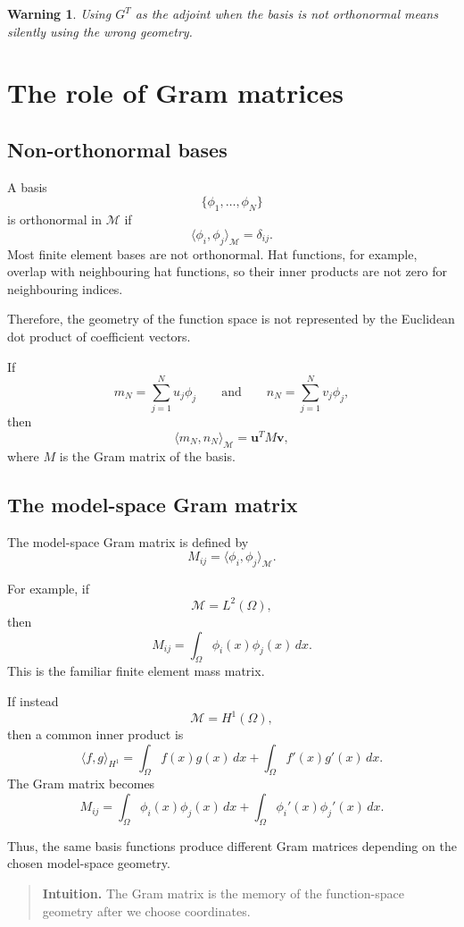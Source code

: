 \documentclass[11pt,a4paper]{book}
\newtheorem{warning}[definition]{Warning}
\newenvironment{intuition}
  {\begin{quote}\textbf{Intuition.}}
  {\end{quote}}
\newcommand{\M}{\mathcal{M}}      %
\begin{document}
\begin{warning}
Using $G^T$ as the adjoint when the basis is not orthonormal means silently
using the wrong geometry.
\end{warning}

\section{The role of Gram matrices}

\subsection{Non-orthonormal bases}

A basis
\[
    \{\phi_1,\ldots,\phi_N\}
\]
is orthonormal in $\M$ if
\[
    \langle \phi_i,\phi_j\rangle_{\M}
    =
    \delta_{ij}.
\]
Most finite element bases are not orthonormal. Hat functions, for example,
overlap with neighbouring hat functions, so their inner products are not zero
for neighbouring indices.

Therefore, the geometry of the function space is not represented by the
Euclidean dot product of coefficient vectors.

If
\[
    m_N=\sum_{j=1}^N u_j\phi_j
    \qquad
    \text{and}
    \qquad
    n_N=\sum_{j=1}^N v_j\phi_j,
\]
then
\[
    \langle m_N,n_N\rangle_{\M}
    =
    \bm{u}^T M\bm{v},
\]
where $M$ is the Gram matrix of the basis.

\subsection{The model-space Gram matrix}

The model-space Gram matrix is defined by
\[
    M_{ij}
    =
    \langle \phi_i,\phi_j\rangle_{\M}.
\]

For example, if
\[
    \M=L^2(\Omega),
\]
then
\[
    M_{ij}
    =
    \int_\Omega \phi_i(x)\phi_j(x)\,dx.
\]
This is the familiar finite element mass matrix.

If instead
\[
    \M=H^1(\Omega),
\]
then a common inner product is
\[
    \langle f,g\rangle_{H^1}
    =
    \int_\Omega f(x)g(x)\,dx
    +
    \int_\Omega f'(x)g'(x)\,dx.
\]
The Gram matrix becomes
\[
    M_{ij}
    =
    \int_\Omega \phi_i(x)\phi_j(x)\,dx
    +
    \int_\Omega \phi_i'(x)\phi_j'(x)\,dx.
\]

Thus, the same basis functions produce different Gram matrices depending on
the chosen model-space geometry.

\begin{intuition}
The Gram matrix is the memory of the function-space geometry after we choose
coordinates.
\end{intuition}
\end{document}
